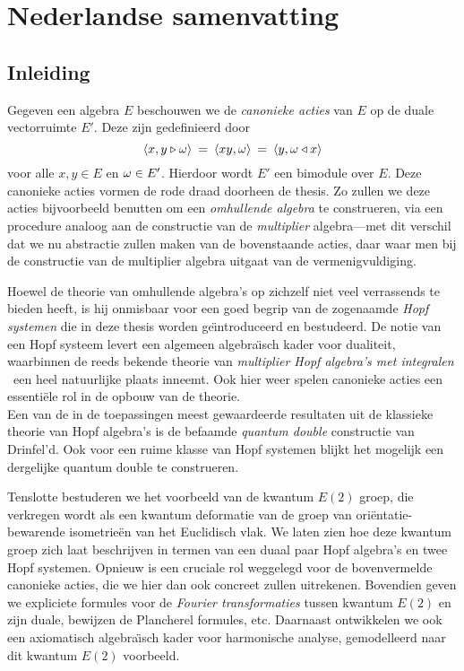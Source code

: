 \documentclass{book}
\begin{document}
\chapter*{Nederlandse samenvatting}
\section{Inleiding}

Gegeven een algebra $E$ beschouwen we de {\em canonieke acties\/} van $E$ op de
duale vectorruimte $E'$. Deze zijn gedefinieerd door
$$  \langle x,y\triangleright \omega \rangle \:=\: \langle xy,\omega \rangle \:=\: \langle y,\omega\triangleleft x \rangle $$
voor alle $x,y \in E$ en $\omega \in E'$.
Hierdoor wordt $E'$ een bimodule over $E$.
Deze canonieke acties vormen de rode draad doorheen de thesis.
Zo zullen we deze acties bijvoorbeeld benutten om een {\em omhullende algebra\/} te construeren,
via een procedure analoog aan de constructie van de {\em multiplier\/}
algebra---met dit verschil dat we nu abstractie zullen maken van de bovenstaande acties,
daar waar men bij de constructie van de multiplier algebra uitgaat van de
vermenigvuldiging.

Hoewel de theorie van omhullende algebra's op zichzelf niet veel verrassends te bieden heeft,
is hij onmisbaar voor een goed begrip van de zogenaamde {\em Hopf systemen\/} die in deze
thesis worden ge\"{\i}ntroduceerd en bestudeerd.
De notie van een Hopf systeem levert een algemeen algebra\"{\i}sch kader voor dualiteit,
waarbinnen de reeds bekende theorie van {\em multiplier Hopf algebra's met integralen\/}
\cite{Fons:AFGD,Fons:AFGD:proc,Fons:pnas}\ een heel natuurlijke plaats inneemt.
Ook hier weer spelen canonieke acties een essenti\"ele rol in de opbouw van de theorie. \\
Een van de in de toepassingen meest gewaardeerde resultaten uit de klassieke theorie van
Hopf algebra's is de befaamde {\em quantum double\/} constructie van \mbox{Drinfel'd}\@.
Ook voor een ruime klasse van Hopf systemen blijkt het mogelijk een dergelijke
quantum double te construeren.


Tenslotte bestuderen we het voorbeeld van de kwantum $E(2)$ groep, die
verkregen wordt als een kwantum deformatie van de groep van ori\"entatie-bewarende
isometrie\"en van het Euclidisch vlak.
We laten zien hoe deze kwantum groep zich laat beschrijven in termen van een
duaal paar Hopf algebra's en twee Hopf systemen.
Opnieuw is een cruciale rol weggelegd voor de bovenvermelde canonieke acties,
die we hier dan ook concreet zullen uitrekenen.
Bovendien geven we expliciete formules voor de {\em Fourier transformaties\/} tussen
kwantum $E(2)$ en zijn duale, bewijzen de Plancherel formules, etc.
Daarnaast ontwikkelen we ook een axiomatisch algebra\"{\i}sch kader voor harmonische
analyse, gemodelleerd naar dit kwantum $E(2)$ voorbeeld.
\end{document}
